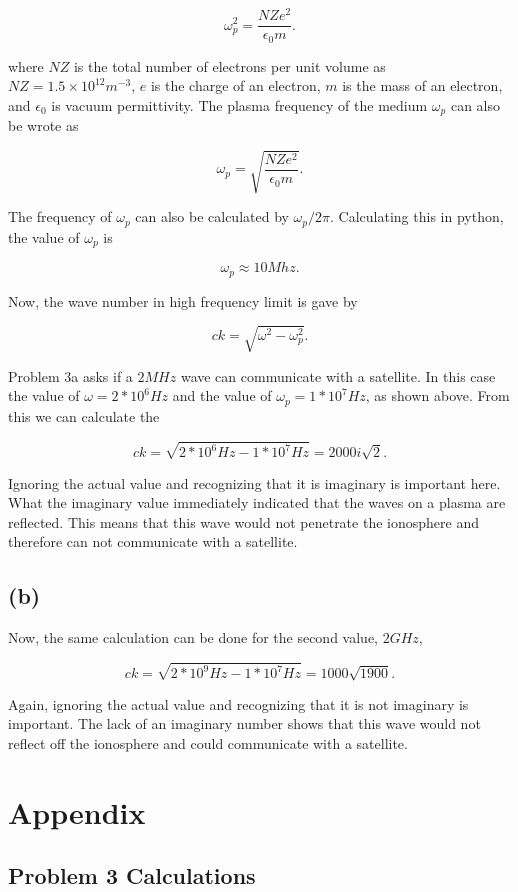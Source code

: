 \documentclass[11pt]{article}
\begin{document}
$$
\omega_{p}^{2} = \frac{NZe^{2}}{\epsilon_{0}m}.
$$

where $NZ$ is the total number of electrons per unit volume as $NZ = 1.5 \times 10^{12} m^{-3}$, $e$ is the charge of an electron, $m$ is the mass of an electron, and $\epsilon_{0}$ is vacuum permittivity. The plasma frequency of the medium $\omega_{p}$ can also be wrote as 

$$
\omega_{p} = \sqrt{\frac{NZe^{2}}{\epsilon_{0}m}}.
$$

The frequency of $\omega_{p}$ can also be calculated by $\omega_{p}/2\pi$. Calculating this in python, the value of $\omega_{p}$ is

$$
\omega_{p} \approx 10 Mhz.
$$

Now, the wave number in high frequency limit is gave by

$$
ck = \sqrt{\omega^{2} - \omega_{p}^{2}}.
$$

Problem 3a asks if a $2MHz$ wave can communicate with a satellite. In this case the value of $\omega = 2*10^{6}Hz$ and the value of $\omega_{p} = 1*10^{7}Hz$, as shown above. From this we can calculate the 

$$
ck = \sqrt{2*10^{6}Hz - 1*10^{7}Hz} = 2000i\sqrt{2}.
$$

Ignoring the actual value and recognizing that it is imaginary is important here. What the imaginary value immediately indicated that the waves on a plasma are reflected. This means that this wave would not penetrate the ionosphere and therefore can not communicate with a satellite.

\subsection*{(b)}

Now, the same calculation can be done for the second value, $2GHz$,

$$
ck = \sqrt{2*10^{9}Hz - 1*10^{7}Hz} = 1000\sqrt{1900}.
$$

Again, ignoring the actual value and recognizing that it is not imaginary is important. The lack of an imaginary number shows that this wave would not reflect off the ionosphere and could communicate with a satellite.

\clearpage

\section*{Appendix}

\subsection*{Problem 3 Calculations}



\end{document}
